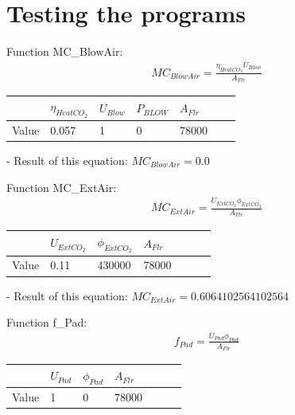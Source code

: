 \documentclass[a4paper]{article}
\begin{document}
\newpage
\section{Testing the programs}
Function MC\_BlowAir:
\begin{align*}
  MC_{BlowAir} = \frac{\eta_{HeatCO_2}U_{Blow}}{A_{Flr}}
\end{align*}

\begin{table}[H]
  \centering
  \begin{tabular}{|l|l|l|l|l|l|l|}
    \hline
          & $\eta_{HeatCO_2}$ & $U_{Blow}$ & $P_{BLOW}$ & $A_{Flr}$ \\
    \hline
    Value & 0.057             & 1          & 0          & 78000     \\
    \hline
  \end{tabular}
\end{table}

- Result of this equation: \(MC_{BlowAir} = 0.0\)

Function MC\_ExtAir:
\begin{align*}
  MC_{ExtAir} = \frac{U_{ExtCO_2}\phi_{ExtCO_2}}{A_{Flr}}
\end{align*}

\begin{table}[H]
  \centering
  \begin{tabular}{|l|l|l|l|l|l|l|}
    \hline
          & $U_{ExtCO_2}$ & $\phi_{ExtCO_2}$ & $A_{Flr}$ \\
    \hline
    Value & 0.11          & 430000           & 78000     \\
    \hline
  \end{tabular}
\end{table}

- Result of this equation: \(MC_{ExtAir} = 0.6064102564102564\)

Function f\_Pad:
\begin{align*}
  f_{Pad} = \frac{U_{Pad} \phi_{Pad}}{A_{Flr}}
\end{align*}

\begin{table}[H]
  \centering
  \begin{tabular}{|l|l|l|l|l|l|l|}
    \hline
          & $U_{Pad}$ & $\phi_{Pad}$ & $A_{Flr}$ \\
    \hline
    Value & 1         & 0            & 78000     \\
    \hline
  \end{tabular}
\end{table}
\end{document}
